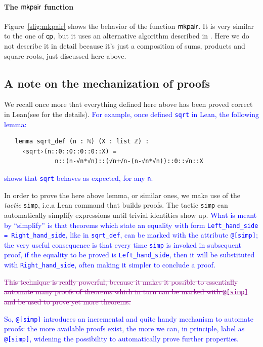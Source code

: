 \documentclass[preprint]{elsarticle}
\theoremstyle{remark}
\newcommand{\LEAN}{\textsf{Lean}\xspace}
\begin{document}
\paragraph{The $\mathsf{mkpair}$ function}
Figure~\ref{sfig:mkpair} shows the behavior of the function $\mathsf{mkpair}$.
It is very similar to the one of $\mathsf{cp}$, but it uses an alternative algorithm described in \cite{Carneiro19}.
Here we do not describe it in detail because it's just a composition of sums, products and square roots,
just discussed here above.

\subsection{A note on the mechanization of proofs}
We recall once more that everything defined here above has been proved correct in \LEAN (see \cite{MalettoRPPLEAN2021} for the details).
\textcolor{blue}{For example, once defined \lstinline|sqrt| in \LEAN, the following lemma:}
\begin{lstlisting}
   lemma sqrt_def (n : ℕ) (X : list ℤ) :
     ‹sqrt›(n::0::0::0::0::X) =
              n::(n-√n*√n)::(√n+√n-(n-√n*√n))::0::√n::X
\end{lstlisting}
\textcolor{blue}{shows that \lstinline|sqrt| behaves as expected, for any \lstinline|n|.}

In order to prove the here above lemma, or similar ones, we make use of the {\it tactic} \lstinline|simp|, i.e.\@ a \LEAN command that builds proofs. The tactic \lstinline|simp| can automatically simplify expressions until trivial identities show up. \textcolor{blue}{What is meant by ``simplify'' is that theorems which state an equality with form \texttt{Left\_hand\_side = Right\_hand\_side}, like in \lstinline|sqrt_def|,  can be marked with the attribute \lstinline|@[simp]|; the very useful consequence is that every time \lstinline|simp| is invoked in subsequent proof, if the equality to be proved is \texttt{Left\_hand\_side}, then it will be substituted with \texttt{Right\_hand\_side}, often making it simpler to conclude a proof.}

\textcolor{purple}{\sout{This technique is really powerful, because it makes it possible to essentially automate many proofs of theorems which in turn can be marked with \lstinline|@[simp]|
and be used to prove yet more theorems.}}

\textcolor{blue}{So, \lstinline|@[simp]| introduces an incremental and quite handy mechanism to automate proofs: the more available proofs exist, the more we can, in principle, label as \lstinline|@[simp]|, widening the possibility to automatically prove further properties.}
\end{document}
